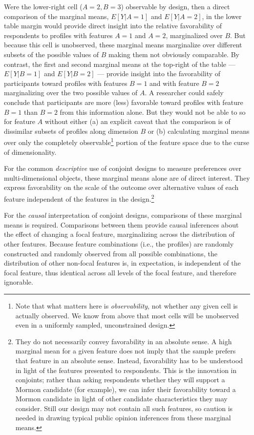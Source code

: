 \documentclass[a4paper,12pt]{article}\usepackage[]{graphicx}\usepackage[]{color}
\begin{document}
\noindent Were the lower-right cell ($A=2, B=3$) observable by design, then a direct comparison of the marginal means, $E[Y|A=1]$ and $E[Y|A=2]$, in the lower table margin would provide direct insight into the relative favorability of respondents to profiles with features $A=1$ and $A=2$, marginalized over $B$. But because this cell is unobserved, these marginal means marginalize over different subsets of the possible values of $B$ making them not obviously comparable. By contrast, the first and second marginal means at the top-right of the table --- $E[Y|B=1]$ and $E[Y|B=2]$ --- provide insight into the favorability of participants toward profiles with features $B=1$ and with feature $B=2$ marginalizing over the two possible values of $A$. A researcher could safely conclude that participants are more (less) favorable toward profiles with feature $B=1$ than $B=2$ from this information alone. But they would not be able to so for feature $A$ without either (a) an explicit caveat that the comparison is of dissimilar subsets of profiles along dimension $B$ or (b) calculating marginal means over only the completely observable\footnote{Note that what matters here is \textit{observability}, not whether any given cell is actually observed. We know from above that most cells will be unobserved even in a uniformly sampled, unconstrained design.} portion of the feature space due to the curse of dimensionality.

For the common \textit{descriptive} use of conjoint designs to measure preferences over multi-dimensional objects, these marginal means alone are of direct interest. They express favorability on the scale of the outcome over alternative values of each feature independent of the features in the design.\footnote{They do not necessarily convey favorability in an absolute sense. A high marginal mean for a given feature does not imply that the sample prefers that feature in an absolute sense. Instead, favorability has to be understood in light of the features presented to respondents. This is the innovation in conjoints; rather than asking respondents whether they will support a Mormon candidate (for example), we can infer their favorability toward a Mormon candidate in light of other candidate characteristics they may consider. Still our design may not contain all such features, so caution is needed in drawing typical public opinion inferences from these marginal means.}

For the \textit{causal} interpretation of conjoint designs, comparisons of these marginal means is required. Comparisons between them provide causal inferences about the effect of changing a focal feature, marginalizing across the distribution of other features. Because feature combinations (i.e., the profiles) are randomly constructed and randomly observed from all possible combinations, the distribution of other non-focal features is, in expectation, is independent of the focal feature, thus identical across all levels of the focal feature, and therefore ignorable.
\end{document}
